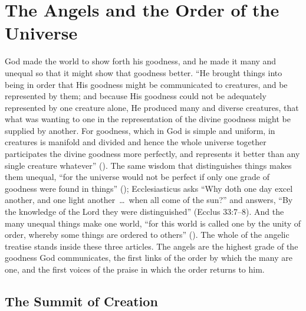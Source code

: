 \section{The Angels and the Order of the Universe}\label{sec:order-universe}

God made the world to show forth his goodness, and he made it many and
unequal so that it might show that goodness better. ``He brought things into
being in order that His goodness might be communicated to creatures, and be
represented by them; and because His goodness could not be adequately
represented by one creature alone, He produced many and diverse creatures,
that what was wanting to one in the representation of the divine goodness
might be supplied by another. For goodness, which in God is simple and
uniform, in creatures is manifold and divided and hence the whole universe
together participates the divine goodness more perfectly, and represents it
better than any single creature whatever'' (). The same
wisdom that distinguishes things makes them unequal, ``for the universe would
not be perfect if only one grade of goodness were found in things'' (); Ecclesiasticus asks ``Why doth one day excel another, and one
light another~\dots\ when all come of the sun?'' and answers, ``By the
knowledge of the Lord they were distinguished'' (Ecclus 33:7--8). And the
many unequal things make one world, ``for this world is called one by the
unity of order, whereby some things are ordered to others'' (). The whole of the angelic treatise stands inside these three articles.
The angels are the highest grade of the goodness God communicates, the first
links of the order by which the many are one, and the first voices of the
praise in which the order returns to him.

\subsection{The Summit of Creation}

